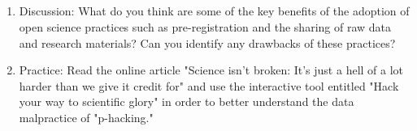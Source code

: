  

\subsection{}
\begin{fullwidth}
\begin{enumerate}
\item Discussion: What do you think are some of the key benefits of the adoption of open science practices such as pre-registration and the sharing of raw data and research materials? Can you identify any drawbacks of these practices?

\item Practice: Read the online article "Science isn't broken: It's just a hell of a lot harder than we give it credit for" and use the interactive tool entitled "Hack your way to scientific glory" in order to better understand the data malpractice of "p-hacking."
\end{enumerate}
\end{fullwidth}  
